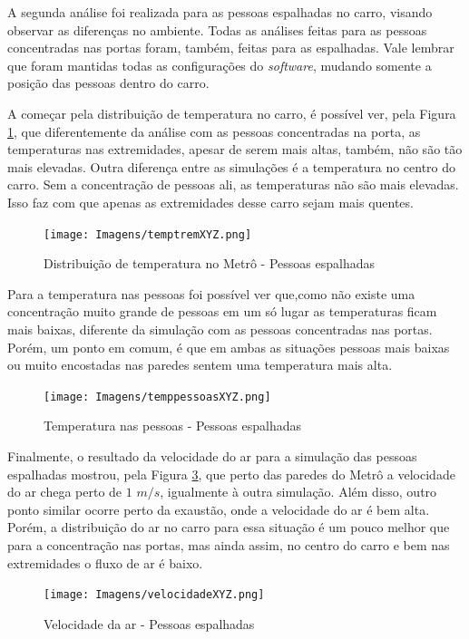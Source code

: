 \documentclass[acronym,symbols,table]{fei}
\begin{document}
A segunda análise foi realizada para as pessoas espalhadas no carro, visando observar as diferenças no ambiente. Todas as análises feitas para as pessoas concentradas nas portas foram, também, feitas para as espalhadas. Vale lembrar que foram mantidas todas as configurações do \textit{software}, mudando somente a posição das pessoas dentro do carro.

A começar pela distribuição de temperatura no carro, é possível ver, pela Figura \ref{fig:temptremXYZ}, que diferentemente da análise com as pessoas concentradas na porta, as temperaturas nas extremidades, apesar de serem mais altas, também, não são tão mais elevadas. Outra diferença entre as simulações é a temperatura no centro do carro. Sem a concentração de pessoas ali, as temperaturas não são mais elevadas. Isso faz com que apenas as extremidades desse carro sejam mais quentes.   

\begin{figure}[!htb]
  \centering
    \caption{Distribuição de temperatura no Metrô - Pessoas espalhadas}
    \texttt{[image: Imagens/temptremXYZ.png]}
    \label{fig:temptremXYZ}
\end{figure}

Para a temperatura nas pessoas foi possível ver que,como não existe uma concentração muito grande de pessoas em um só lugar as temperaturas ficam mais baixas, diferente da simulação com as pessoas concentradas nas portas. Porém, um ponto em comum, é que em ambas as situações pessoas mais baixas ou muito encostadas nas paredes sentem uma temperatura mais alta.

\begin{figure}[!htb]
  \centering
    \caption{Temperatura nas pessoas - Pessoas espalhadas}
    \texttt{[image: Imagens/temppessoasXYZ.png]}
    \label{fig:temppessoasXYZ}
\end{figure}

Finalmente, o resultado da velocidade do ar para a simulação das pessoas espalhadas mostrou, pela Figura \ref{fig:velocidadeXYZ}, que perto das paredes do Metrô a velocidade do ar chega perto de $1$ $m/s$, igualmente à outra simulação. Além disso, outro ponto similar ocorre perto da exaustão, onde a velocidade do ar é bem alta. Porém, a distribuição do ar no carro para essa situação é um pouco melhor que para a concentração nas portas, mas ainda assim, no centro do carro e bem nas extremidades o fluxo de ar é baixo. 

\begin{figure}[!htb]
  \centering
    \caption{Velocidade da ar - Pessoas espalhadas}
    \texttt{[image: Imagens/velocidadeXYZ.png]}
    \label{fig:velocidadeXYZ}
\end{figure}
\end{document}
